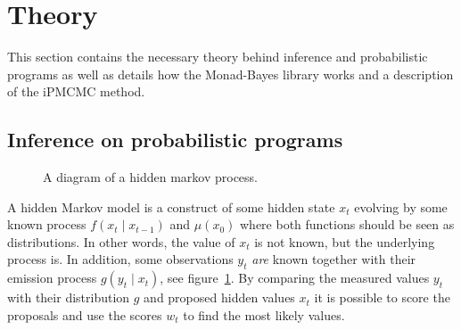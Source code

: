 \section{Theory}

This section contains the necessary theory behind inference and probabilistic programs as well as details how the Monad-Bayes library works and a description of the iPMCMC method.

\subsection{Inference on probabilistic programs}
\label{sub:inference_on_probabilistic_programs}

\begin{figure}[h!]
\begin{center}
\end{center}
\caption{A diagram of a hidden markov process.}
\label{fig:hmm}
\end{figure}

A hidden Markov model is a construct of some hidden state $x_t$ evolving by some known process $f(x_t \mid x_{t-1})$ and $\mu(x_0)$ where both functions should be seen as distributions. In other words, the value of $x_t$ is not known, but the underlying process is. In addition, some observations $y_t$ \emph{are} known together with their emission process $g(y_t \mid x_t)$, see figure~\ref{fig:hmm}. By comparing the measured values $y_t$ with their distribution $g$ and proposed hidden values $x_t$ it is possible to score the proposals and use the scores $w_t$ to find the most likely values.


